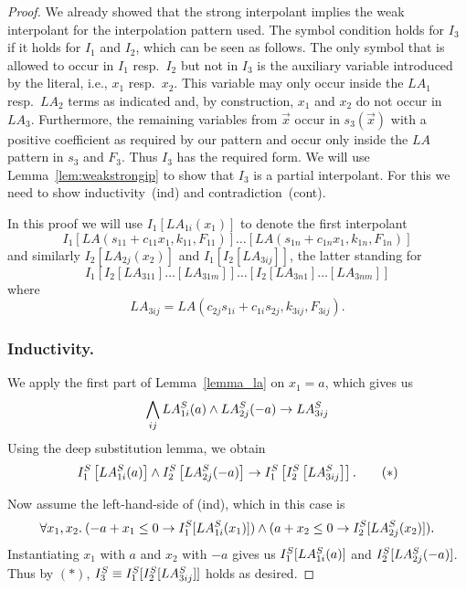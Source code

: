 \begin{techreport}
\begin{proof}
\ifnewinterpolation\else
We already showed that the strong interpolant implies the weak
interpolant for the interpolation pattern used.
\fi
The symbol condition
holds for $I_3$ if it holds for $I_1$ and $I_2$, which can be seen as
follows.  The only symbol that is allowed to occur in $I_1$ resp.\
$I_2$ but not in $I_3$ is the auxiliary variable introduced by the
literal, i.e., $x_1$ resp.\ $x_2$.  This variable may only occur
inside the $LA_1$ resp.\ $LA_2$ terms as indicated and, by
construction, $x_1$ and $x_2$ do not occur in $LA_3$.  Furthermore,
the remaining variables from $\vec x$ occur in $s_3(\vec x)$ with a
positive coefficient as required by our pattern and occur only inside
the $LA$ pattern in $s_3$ and $F_3$.  Thus $I_3$ has the required
form.  We will use Lemma~\ref{lem:weakstrongip} to show that $I_3$ is
a partial interpolant.  For this we need to show inductivity~(ind) and
contradiction~(cont).

In this proof we will use $I_1[LA_{1i}(x_1)]$ to denote the first interpolant
\[I_1[LA(s_{11}+c_{11}x_1, k_{11}, F_{11})]\dots[LA(s_{1n}+c_{1n}x_1, k_{1n}, F_{1n})]\]
and similarly $I_2[LA_{2j}(x_2)]$ and $I_1[I_2[LA_{3ij}]]$, the latter standing for
\[I_1[I_2[LA_{311}]\dots[LA_{31m}]]\dots [I_2[LA_{3n1}]\dots[LA_{3nm}]]\]
where 
\[
LA_{3ij} = LA(c_{2j}s_{1i}+c_{1i}s_{2j}, k_{3ij}, F_{3ij}).
\]


\subsubsection*{Inductivity.}
We apply \ifnewinterpolation\else the first part of \fi Lemma~\ref{lemma_la} on $x_1=a$, which
gives us
\[\bigwedge_{ij} LA_{1i}\S(a) \wedge LA_{2j}\S(-a) \rightarrow LA_{3ij}\S\]
Using the deep substitution lemma, we obtain 
\[
  I_{1}\S\left[LA_{1i}\S(a)\right]\wedge I_{2}\S\left[LA_{2j}\S(-a)\right]\rightarrow I_{1}\S\left[I_{2}\S\left[LA_{3ij}\S\right]\right].
\tag{$*$}
\]

Now assume the left-hand-side of (ind), which in this case is
\[
    \forall x_1, x_2.\:  
      (-a + x_1 \leq 0\rightarrow I_1\S[LA\S_{1i}(x_1)])  \land 
      (a + x_2 \leq 0 \rightarrow I_2\S[LA\S_{2j}(x_2)]).
\]
Instantiating $x_1$ with $a$ and $x_2$ with $-a$ gives us
$I_1\S[LA\S_{1i}(a)]$ and $I_2\S[LA\S_{2j}(-a)]$.  
%
Thus by $(*)$, $I_{3}\S\equiv I_1\S[I_2\S[LA_{3ij}\S]]$ holds as desired.


\end{proof}
\end{techreport}
